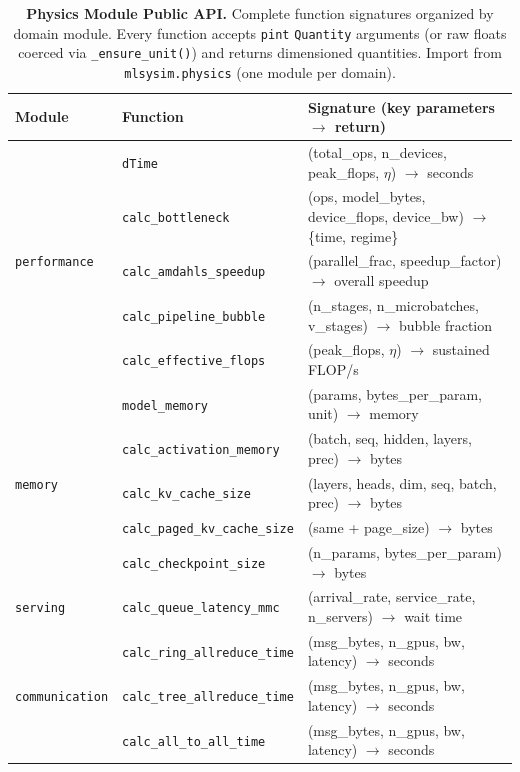 \documentclass[10pt,twocolumn]{article}
\begin{document}
\begin{table}[!t]
\centering
\small
\renewcommand{\arraystretch}{1.05}
\caption{\textbf{Physics Module Public API.} Complete function signatures organized by domain module. Every function accepts \texttt{pint} \texttt{Quantity} arguments (or raw floats coerced via \texttt{\_ensure\_unit()}) and returns dimensioned quantities. Import from \texttt{mlsysim.physics} (one module per domain).}
\label{tab:physics-api}
\begin{tabularx}{\textwidth}{@{}l l X@{}}
\toprule
\textbf{Module} & \textbf{Function} & \textbf{Signature (key parameters $\to$ return)} \\
\midrule
\multirow{5}{*}{\texttt{performance}} & \texttt{dTime} & (total\_ops, n\_devices, peak\_flops, $\eta$) $\to$ seconds \\
 & \texttt{calc\_bottleneck} & (ops, model\_bytes, device\_flops, device\_bw) $\to$ \{time, regime\} \\
 & \texttt{calc\_amdahls\_speedup} & (parallel\_frac, speedup\_factor) $\to$ overall speedup \\
 & \texttt{calc\_pipeline\_bubble} & (n\_stages, n\_microbatches, v\_stages) $\to$ bubble fraction \\
 & \texttt{calc\_effective\_flops} & (peak\_flops, $\eta$) $\to$ sustained FLOP/s \\
\midrule
\multirow{5}{*}{\texttt{memory}} & \texttt{model\_memory} & (params, bytes\_per\_param, unit) $\to$ memory \\
 & \texttt{calc\_activation\_memory} & (batch, seq, hidden, layers, prec) $\to$ bytes \\
 & \texttt{calc\_kv\_cache\_size} & (layers, heads, dim, seq, batch, prec) $\to$ bytes \\
 & \texttt{calc\_paged\_kv\_cache\_size} & (same + page\_size) $\to$ bytes \\
 & \texttt{calc\_checkpoint\_size} & (n\_params, bytes\_per\_param) $\to$ bytes \\
\midrule
\texttt{serving} & \texttt{calc\_queue\_latency\_mmc} & (arrival\_rate, service\_rate, n\_servers) $\to$ wait time \\
\midrule
\multirow{4}{*}{\texttt{communication}} & \texttt{calc\_ring\_allreduce\_time} & (msg\_bytes, n\_gpus, bw, latency) $\to$ seconds \\
 & \texttt{calc\_tree\_allreduce\_time} & (msg\_bytes, n\_gpus, bw, latency) $\to$ seconds \\
 & \texttt{calc\_all\_to\_all\_time} & (msg\_bytes, n\_gpus, bw, latency) $\to$ seconds \\

\end{tabularx}
\end{table}
\end{document}
